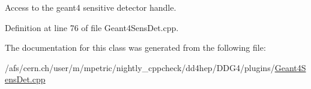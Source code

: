 Access to the geant4 sensitive detector handle. 



Definition at line 76 of file Geant4\+Sens\+Det.\+cpp.



The documentation for this class was generated from the following file\+:\begin{DoxyCompactItemize}
\item 
/afs/cern.\+ch/user/m/mpetric/nightly\+\_\+cppcheck/dd4hep/\+D\+D\+G4/plugins/\hyperlink{_geant4_sens_det_8cpp}{Geant4\+Sens\+Det.\+cpp}\end{DoxyCompactItemize}
